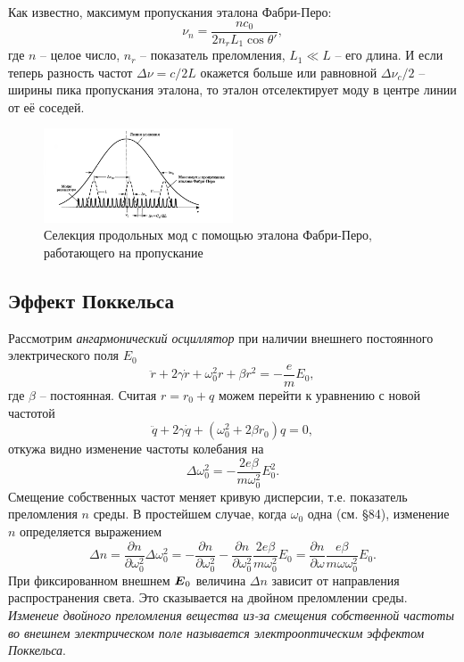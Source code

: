 Как известно, максимум пропускания эталона Фабри-Перо:
\begin{equation*}
    \nu_n = \frac{n c_0}{2 n_r L_1 \cos \theta'},
\end{equation*}
где $n$ -- целое число, $n_r$ -- показатель преломления, $L_1 \ll L$ -- его длина. И если теперь разность частот $\Delta \nu = c/2L$ окажется больше или равновной $\Delta \nu_c/2$ -- ширины пика пропускания эталона, то эталон отселектирует моду в центре линии от её соседей.

\begin{figure}[htb]
    \centering
    \includegraphics[width=0.5\textwidth]{figures/014.png}
    \caption{Селекция продольных мод с помощью эталона Фабри-Перо, работающего на пропускание}
\end{figure}








\subsection{Эффект Поккельса}

Рассмотрим \textit{ангармонический осциллятор}  при наличии внешнего постоянного электрического поля $E_0$ 
\begin{equation*}
    \ddot{r} + 2 \gamma \dot{r} + \omega_0^2 r + \beta r^2 = -\frac{e}{m}E_0,
\end{equation*}
где $\beta$ -- постоянная. Считая $r = r_0 + q$ можем перейти к уравнению с новой частотой
\begin{equation*}
    \ddot{q} + 2 \gamma \dot{q} + (\omega_0^2+ 2\beta r_0) q =0,
\end{equation*}
откужа видно изменение частоты колебания на 
\begin{equation*}
    \Delta \omega_0^2 = -\frac{2 e \beta}{m \omega_0^2} E_0^2.
\end{equation*}
Смещение собственных частот меняет кривую дисперсии, т.е. показатель преломления $n$ среды. В простейшем случае, когда $\omega_0$ одна (см. \S 84), изменение $n$ определяется выражением
\begin{equation*}
    \Delta n = \frac{\partial n}{\partial \omega_0^2} \Delta \omega_0^2 = - \frac{\partial n}{\partial \omega_0^2} 
    - \frac{\partial n}{\partial \omega_0^2} \frac{2e\beta}{m \omega_0^2} E_0 = 
    \frac{\partial n}{\partial \omega} \frac{e\beta}{m \omega \omega_0^2} E_0.
\end{equation*}
При фиксированном внешнем $\mbox{\boldmath $E$}_0$ величина $\Delta n$ зависит от направления распространения света.
Это сказывается на двойном преломлении среды. \textit{Изменеие двойного преломления вещества из-за смещения собственной частоты во внешнем электрическом поле называется электрооптическим эффектом Поккельса}.

